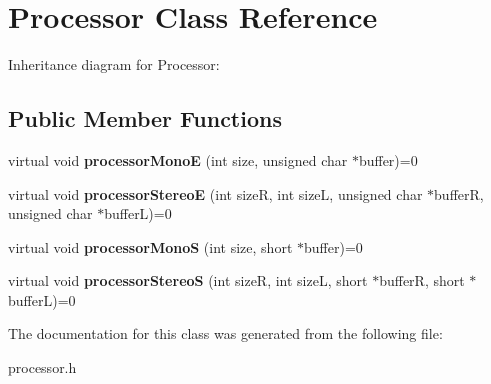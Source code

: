 \hypertarget{classProcessor}{}\section{Processor Class Reference}
\label{classProcessor}


Inheritance diagram for Processor\+:
\subsection*{Public Member Functions}
\begin{DoxyCompactItemize}
\item 
\mbox{\label{classProcessor_aa9742b5df48a3c6442d521ce93012fc1}} 
virtual void {\bfseries processor\+MonoE} (int size, unsigned char $\ast$buffer)=0
\item 
\mbox{\label{classProcessor_a637904e06d0a3b14f9e1e90fe7f3afbd}} 
virtual void {\bfseries processor\+StereoE} (int sizeR, int sizeL, unsigned char $\ast$bufferR, unsigned char $\ast$bufferL)=0
\item 
\mbox{\label{classProcessor_a4cf32c9f7e26383490e8fb49defcc287}} 
virtual void {\bfseries processor\+MonoS} (int size, short $\ast$buffer)=0
\item 
\mbox{\label{classProcessor_ae3fc266daadbedfa947e596d3ff98a7c}} 
virtual void {\bfseries processor\+StereoS} (int sizeR, int sizeL, short $\ast$bufferR, short $\ast$bufferL)=0
\end{DoxyCompactItemize}


The documentation for this class was generated from the following file\+:\begin{DoxyCompactItemize}
\item 
processor.\+h\end{DoxyCompactItemize}
